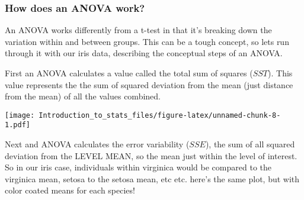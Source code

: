 \documentclass[
]{article}
\newenvironment{Shaded}{\begin{snugshade}}{\end{snugshade}}
\newcommand{\CommentTok}[1]{\textcolor[rgb]{0.56,0.35,0.01}{\textit{#1}}}
\newcommand{\DataTypeTok}[1]{\textcolor[rgb]{0.13,0.29,0.53}{#1}}
\newcommand{\DecValTok}[1]{\textcolor[rgb]{0.00,0.00,0.81}{#1}}
\newcommand{\KeywordTok}[1]{\textcolor[rgb]{0.13,0.29,0.53}{\textbf{#1}}}
\newcommand{\NormalTok}[1]{#1}
\newcommand{\OperatorTok}[1]{\textcolor[rgb]{0.81,0.36,0.00}{\textbf{#1}}}
\newcommand{\StringTok}[1]{\textcolor[rgb]{0.31,0.60,0.02}{#1}}
\begin{document}
\hypertarget{how-does-an-anova-work}{%
\subsubsection{How does an ANOVA work?}\label{how-does-an-anova-work}}

An ANOVA works differently from a t-test in that it's breaking down the
variation within and between groups. This can be a tough concept, so
lets run through it with our iris data, describing the conceptual steps
of an ANOVA.

First an ANOVA calculates a value called the total sum of squares
(\(SST\)). This value represents the the sum of squared deviation from
the mean (just distance from the mean) of all the values combined.

\begin{Shaded}
\end{Shaded}

\texttt{[image: Introduction\_to\_stats\_files/figure-latex/unnamed-chunk-8-1.pdf]}

Next and ANOVA calculates the error variability (\(SSE\)), the sum of
all squared deviation from the LEVEL MEAN, so the mean just within the
level of interest. So in our iris case, individuals within virginica
would be compared to the virginica mean, setosa to the setosa mean, etc
etc. here's the same plot, but with color coated means for each species!

\begin{Shaded}
\end{Shaded}
\end{document}
